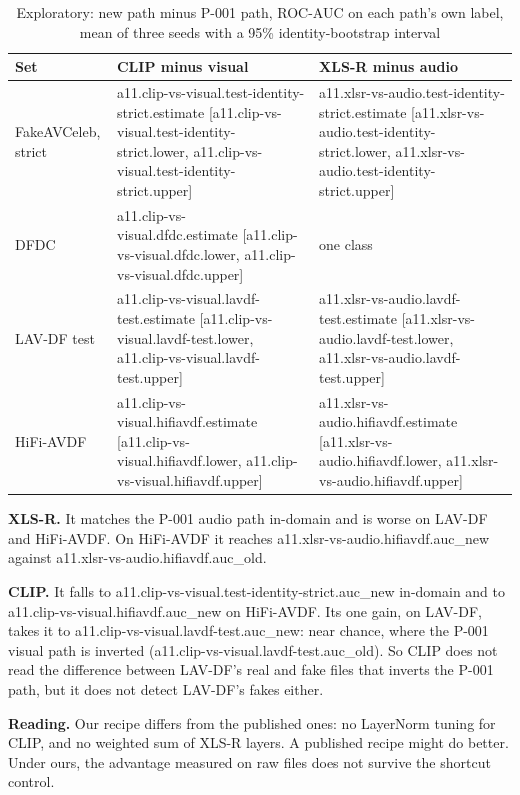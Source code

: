 \begin{table}[htbp]
    \centering
    \caption{Exploratory: new path minus P-001 path, ROC-AUC on each
    path's own label, mean of three seeds with a 95\% identity-bootstrap
    interval}
    \label{tab:a11}
    \begin{tabular}{lll}
        \toprule
        Set & CLIP minus visual & XLS-R minus audio \\
        \midrule
        FakeAVCeleb, strict & {{a11.clip-vs-visual.test-identity-strict.estimate}} [{{a11.clip-vs-visual.test-identity-strict.lower}}, {{a11.clip-vs-visual.test-identity-strict.upper}}] & {{a11.xlsr-vs-audio.test-identity-strict.estimate}} [{{a11.xlsr-vs-audio.test-identity-strict.lower}}, {{a11.xlsr-vs-audio.test-identity-strict.upper}}] \\
        DFDC & {{a11.clip-vs-visual.dfdc.estimate}} [{{a11.clip-vs-visual.dfdc.lower}}, {{a11.clip-vs-visual.dfdc.upper}}] & one class \\
        LAV-DF test & {{a11.clip-vs-visual.lavdf-test.estimate}} [{{a11.clip-vs-visual.lavdf-test.lower}}, {{a11.clip-vs-visual.lavdf-test.upper}}] & {{a11.xlsr-vs-audio.lavdf-test.estimate}} [{{a11.xlsr-vs-audio.lavdf-test.lower}}, {{a11.xlsr-vs-audio.lavdf-test.upper}}] \\
        HiFi-AVDF & {{a11.clip-vs-visual.hifiavdf.estimate}} [{{a11.clip-vs-visual.hifiavdf.lower}}, {{a11.clip-vs-visual.hifiavdf.upper}}] & {{a11.xlsr-vs-audio.hifiavdf.estimate}} [{{a11.xlsr-vs-audio.hifiavdf.lower}}, {{a11.xlsr-vs-audio.hifiavdf.upper}}] \\
        \bottomrule
    \end{tabular}
\end{table}

\textbf{XLS-R.} It matches the P-001 audio path in-domain and is worse on
LAV-DF and HiFi-AVDF. On HiFi-AVDF it reaches
{{a11.xlsr-vs-audio.hifiavdf.auc_new}} against
{{a11.xlsr-vs-audio.hifiavdf.auc_old}}.

\textbf{CLIP.} It falls to {{a11.clip-vs-visual.test-identity-strict.auc_new}}
in-domain and to {{a11.clip-vs-visual.hifiavdf.auc_new}} on HiFi-AVDF. Its one
gain, on LAV-DF, takes it to {{a11.clip-vs-visual.lavdf-test.auc_new}}: near
chance, where the P-001 visual path is inverted
({{a11.clip-vs-visual.lavdf-test.auc_old}}). So CLIP does not read the
difference between LAV-DF's real and fake files that inverts the P-001 path,
but it does not detect LAV-DF's fakes either.

\textbf{Reading.} Our recipe differs from the published ones: no LayerNorm
tuning for CLIP, and no weighted sum of XLS-R layers. A published recipe might
do better. Under ours, the advantage measured on raw files does not survive the
shortcut control.

